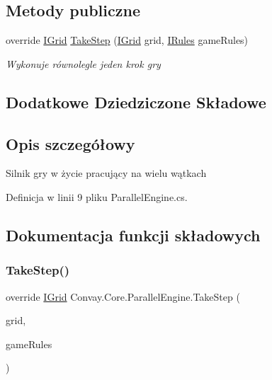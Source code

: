 \subsection*{Metody publiczne}
\begin{DoxyCompactItemize}
\item 
override \hyperlink{interface_convay_1_1_core_1_1_interfaces_1_1_i_grid}{I\+Grid} \hyperlink{class_convay_1_1_core_1_1_parallel_engine_a32e4a4911dcbb74f555b99944940d921}{Take\+Step} (\hyperlink{interface_convay_1_1_core_1_1_interfaces_1_1_i_grid}{I\+Grid} grid, \hyperlink{interface_convay_1_1_core_1_1_interfaces_1_1_i_rules}{I\+Rules} game\+Rules)
\begin{DoxyCompactList}\small\item\em Wykonuje równolegle jeden krok gry \end{DoxyCompactList}\end{DoxyCompactItemize}
\subsection*{Dodatkowe Dziedziczone Składowe}


\subsection{Opis szczegółowy}
Silnik gry w życie pracujący na wielu wątkach 



Definicja w linii 9 pliku Parallel\+Engine.\+cs.



\subsection{Dokumentacja funkcji składowych}
\hypertarget{class_convay_1_1_core_1_1_parallel_engine_a32e4a4911dcbb74f555b99944940d921}{}\label{class_convay_1_1_core_1_1_parallel_engine_a32e4a4911dcbb74f555b99944940d921} 
\subsubsection{\texorpdfstring{Take\+Step()}{TakeStep()}}
{\footnotesize\ttfamily override \hyperlink{interface_convay_1_1_core_1_1_interfaces_1_1_i_grid}{I\+Grid} Convay.\+Core.\+Parallel\+Engine.\+Take\+Step (\begin{DoxyParamCaption}\item[{\hyperlink{interface_convay_1_1_core_1_1_interfaces_1_1_i_grid}{I\+Grid}}]{grid,  }\item[{\hyperlink{interface_convay_1_1_core_1_1_interfaces_1_1_i_rules}{I\+Rules}}]{game\+Rules }\end{DoxyParamCaption})\hspace{0.3cm}{\ttfamily [virtual]}}



